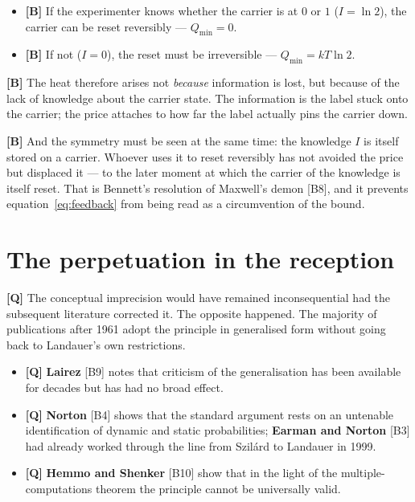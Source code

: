\begin{itemize}[leftmargin=1.4em,itemsep=0.25em]
  \item \textbf{[B]} If the experimenter knows whether the carrier is at $0$ or $1$
        ($I = \ln 2$), the carrier can be reset reversibly --- $Q_{\min} = 0$.
  \item \textbf{[B]} If not ($I = 0$), the reset must be irreversible ---
        $Q_{\min} = kT\ln 2$.
\end{itemize}

\textbf{[B]} The heat therefore arises not \emph{because} information is lost, but because
of the lack of knowledge about the carrier state. The information is the label
stuck onto the carrier; the price attaches to how far the label actually pins the
carrier down.

\textbf{[B]} And the symmetry must be seen at the same time: the knowledge $I$ is itself
stored on a carrier. Whoever uses it to reset reversibly has not avoided the price
but displaced it --- to the later moment at which the carrier of the knowledge is
itself reset. That is Bennett's resolution of Maxwell's demon [B8], and it
prevents equation~\eqref{eq:feedback} from being read as a circumvention of the
bound.

\section{The perpetuation in the reception}

\textbf{[Q]} The conceptual imprecision would have remained inconsequential had the
subsequent literature corrected it. The opposite happened. The majority of
publications after 1961 adopt the principle in generalised form without going back
to Landauer's own restrictions.

\begin{itemize}[leftmargin=1.4em,itemsep=0.3em]
  \item \textbf{[Q]} \textbf{Lairez} [B9] notes that criticism of the generalisation has
        been available for decades but has had no broad effect.
  \item \textbf{[Q]} \textbf{Norton} [B4] shows that the standard argument rests on an
        untenable identification of dynamic and static probabilities;
        \textbf{Earman and Norton} [B3] had already worked through the line from
        Szilárd to Landauer in 1999.
  \item \textbf{[Q]} \textbf{Hemmo and Shenker} [B10] show that in the light of the
        multiple-computations theorem the principle cannot be universally valid.
\end{itemize}

